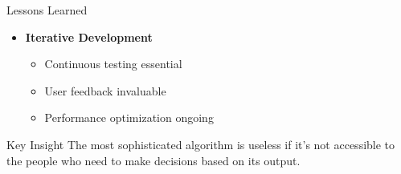 {\begin{block}{Lessons Learned}
\begin{itemize}
			\item \textbf{Iterative Development}
			\begin{itemize}
				\item Continuous testing essential
				\item User feedback invaluable
				\item Performance optimization ongoing
			\end{itemize}
		\end{itemize}
	\end{block}
	
	\begin{exampleblock}{Key Insight}
		The most sophisticated algorithm is useless if it's not accessible to the people who need to make decisions based on its output.
	\end{exampleblock}
}


